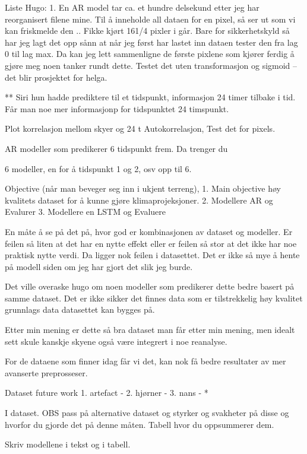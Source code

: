 Liste Hugo:
1. En AR model tar ca. et hundre delsekund etter jeg har reorganisert filene mine. Til å inneholde all dataen for en pixel, så ser ut som vi kan friskmelde den .. Fikke kjørt 161/4 pixler i går. Bare for sikkerhetskyld så har jeg lagt det opp sånn at når jeg først har lastet inn dataen tester den fra lag 0 til lag max. Da kan jeg lett sammenligne de første pixlene som kjører ferdig å gjøre meg noen tanker rundt dette. Testet det uten transformasjon og sigmoid -- det blir prosjektet for helga. 

** Siri hun hadde prediktere til et tidspunkt, informasjon 24 timer tilbake i tid.
Får man noe mer informasjonp for tidspunktet 24 timspunkt.

Plot korrelasjon mellom skyer og 24 t 
Autokorrelasjon, Test det for pixels. 

AR modeller som predikerer 6 tidspunkt frem. Da trenger du 

6 modeller, en for å tidspunkt 1 og 2, osv opp til 6.


Objective (når man beveger seg inn i ukjent terreng), 
1. Main objective høy kvalitets dataset for å kunne gjøre klimaprojeksjoner. 
2. Modellere AR og Evalurer
3. Modellere en LSTM og Evaluere


En måte å se på det på, hvor god er kombinasjonen av dataset og modeller. Er feilen så liten at det har en nytte effekt eller er feilen så stor at det ikke har noe praktisk nytte verdi. Da ligger nok feilen i datasettet. Det er ikke så mye å hente på modell siden om jeg har gjort det slik jeg burde.

Det ville overaske hugo om noen modeller som predikerer dette bedre basert på samme dataset. Det er ikke sikker det finnes data som er tilstrekkelig høy kvalitet grunnlags data datasettet kan bygges på.

Etter min mening er dette så bra dataset man får etter min mening, men idealt sett skule kanskje skyene også være integrert i noe reanalyse. 

For de dataene som finner idag får vi det, kan nok få bedre resultater av mer avanserte preprosseser.

Dataset future work
1. artefact -
2. hjørner -
3. nans -
  * 
  
I dataset. 
OBS pass på alternative dataset og styrker og svakheter på disse og hvorfor du gjorde det på denne måten. 
Tabell hvor du oppsummerer dem.

Skriv modellene i tekst og i tabell. 